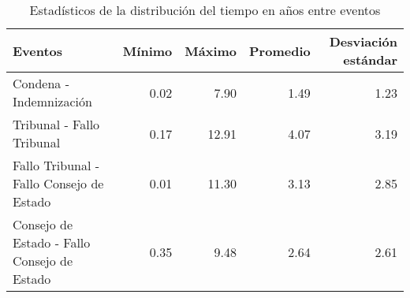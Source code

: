 \begin{table}[h]
\centering
\caption{Estadísticos de la distribución del
tiempo en años entre eventos} 
\label{tab:eventos-otros}
\begin{tabular}{p{6cm}rrrr}
  \hline
Eventos & Mínimo & Máximo & Promedio & Desviación estándar \\ 
  \hline
Condena - Indemnización & 0.02 & 7.90 & 1.49 & 1.23 \\ 
  Tribunal - Fallo Tribunal & 0.17 & 12.91 & 4.07 & 3.19 \\ 
  Fallo Tribunal - Fallo Consejo de Estado & 0.01 & 11.30 & 3.13 & 2.85 \\ 
  Consejo de Estado - Fallo Consejo de Estado & 0.35 & 9.48 & 2.64 & 2.61 \\ 
   \hline
\end{tabular}
\end{table}

